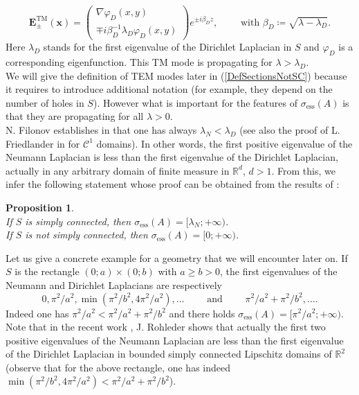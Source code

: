 \documentclass[11pt,a4paper]{article}
\newcommand{\mrm}[1]{\mathrm{#1}}
\newcommand{\bfx}{\boldsymbol{x}}
\newcommand{\R}{\mathbb{R}}
\def\E{\boldsymbol{E}}
\newtheorem{proposition}[theorem]{Proposition}
\begin{document}
\begin{equation}\label{DefTMmodes}
\E^{\mrm{TM}}_\pm(\bfx)=\left(\begin{array}{c}\nabla \varphi_D(x,y)\\[2pt]\mp i\beta_D^{-1}\lambda_D\varphi_D(x,y)\end{array}\right)e^{\pm i\beta_D z},\qquad\mbox{ with }\beta_D\coloneqq\sqrt{\lambda-\lambda_D}.
\end{equation}
Here $\lambda_D$ stands for the first eigenvalue of the Dirichlet Laplacian in $S$ and $\varphi_D$ is a corresponding eigenfunction. This TM mode is propagating for $\lambda>\lambda_D$.\\
\newline
We will give the definition of TEM modes later in (\ref{DefSectionsNotSC}) because it requires to introduce additional notation (for example, they depend on the number of holes in $S$). However what is important for the features of $\sigma_{\mrm{ess}}(A)$ is that they are propagating for all $\lambda>0$.\\  
\newline
N. Filonov establishes in \cite{Filo05} that one has always $\lambda_N<\lambda_D$ (see also the proof of L. Friedlander in \cite{Frie91} for $\mathscr{C}^1$ domains). In other words, the first positive eigenvalue of the Neumann Laplacian is less than the first eigenvalue of the Dirichlet Laplacian, actually in any arbitrary domain of finite measure in $\R^d$, $d > 1$. From this, we infer the following statement whose proof can be obtained from the results of \cite{Filo19,FeMa24}:
\begin{proposition}\label{DefSigmaEss}~\\[2pt]
If $S$ is simply connected, then $\sigma_{\mrm{ess}}(A)=[\lambda_N;+\infty)$.\\[2pt]
If $S$ is not simply connected, then $\sigma_{\mrm{ess}}(A)=[0;+\infty)$.
\end{proposition}
\noindent Let us give a concrete example for a geometry that we will encounter later on. If $S$ is the rectangle $(0;a)\times(0;b)$ with $a\ge b>0$, the first eigenvalues of the Neumann and Dirichlet Laplacians are respectively 
\[
0,\pi^2/a^2,\min(\pi^2/b^2,4\pi^2/a^2), \dots\qquad\mbox{ and }\qquad \pi^2/a^2+\pi^2/b^2,\dots.
\] 
Indeed one has $\pi^2/a^2<\pi^2/a^2+\pi^2/b^2$ and there holds $\sigma_{\mrm{ess}}(A)=[\pi^2/a^2;+\infty)$. Note that in the recent work \cite{Rohl25}, J. Rohleder shows that actually the first two positive eigenvalues of the Neumann Laplacian are less than the first eigenvalue of the Dirichlet Laplacian in bounded simply connected Lipschitz domains of $\R^2$ (observe that for the above rectangle, one has indeed $\min(\pi^2/b^2,4\pi^2/a^2)<\pi^2/a^2+\pi^2/b^2$).\\
\end{document}
